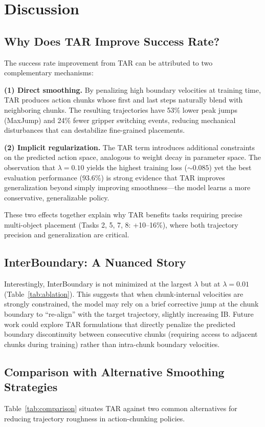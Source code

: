 \section{Discussion}
\label{sec:discussion}

\subsection{Why Does TAR Improve Success Rate?}
The success rate improvement from TAR can be attributed to two complementary mechanisms:

\textbf{(1) Direct smoothing.} By penalizing high boundary velocities at training time, TAR produces action chunks whose first and last steps naturally blend with neighboring chunks. The resulting trajectories have 53\% lower peak jumps (MaxJump) and 24\% fewer gripper switching events, reducing mechanical disturbances that can destabilize fine-grained placements.

\textbf{(2) Implicit regularization.} The TAR term introduces additional constraints on the predicted action space, analogous to weight decay in parameter space. The observation that $\lambda=0.10$ yields the highest training loss (${\sim}0.085$) yet the best evaluation performance (93.6\%) is strong evidence that TAR improves generalization beyond simply improving smoothness---the model learns a more conservative, generalizable policy.

These two effects together explain why TAR benefits tasks requiring precise multi-object placement (Tasks 2, 5, 7, 8: +10--16\%), where both trajectory precision and generalization are critical.

\subsection{InterBoundary: A Nuanced Story}
Interestingly, InterBoundary is not minimized at the largest $\lambda$ but at $\lambda=0.01$ (Table~\ref{tab:ablation}). This suggests that when chunk-internal velocities are strongly constrained, the model may rely on a brief corrective jump at the chunk boundary to ``re-align'' with the target trajectory, slightly increasing IB. Future work could explore TAR formulations that directly penalize the predicted boundary discontinuity between consecutive chunks (requiring access to adjacent chunks during training) rather than intra-chunk boundary velocities.

\subsection{Comparison with Alternative Smoothing Strategies}
Table~\ref{tab:comparison} situates TAR against two common alternatives for reducing trajectory roughness in action-chunking policies.

